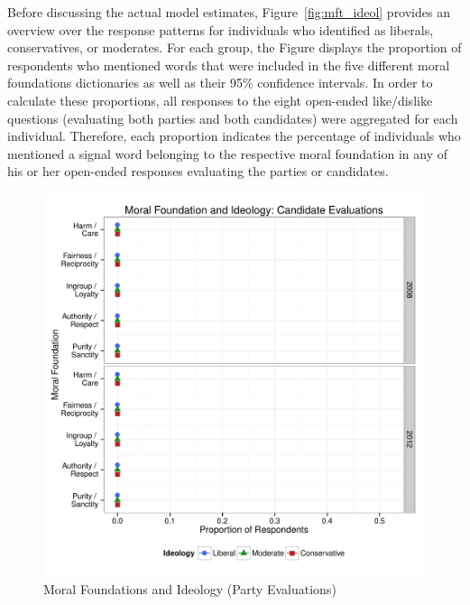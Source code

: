 \documentclass[12pt]{article}
\begin{document}
Before discussing the actual model estimates, Figure~\ref{fig:mft_ideol} provides an overview over the response patterns for individuals who identified as liberals, conservatives, or moderates. For each group, the Figure displays the proportion of respondents who mentioned words that were included in the five different moral foundations dictionaries as well as their 95\% confidence intervals. In order to calculate these proportions, all responses to the eight open-ended like/dislike questions (evaluating both parties and both candidates) were aggregated for each individual. Therefore, each proportion indicates the percentage of individuals who mentioned a signal word belonging to the respective moral foundation in any of his or her open-ended responses evaluating the parties or candidates.

\begin{figure}\centering
\includegraphics[scale=.6]{../calc/fig/p2_mft_ideol_ca.pdf}
\caption{Moral Foundations and Ideology (Party Evaluations)}\label{fig:mft_ideol_pa}
\end{figure}
\end{document}
